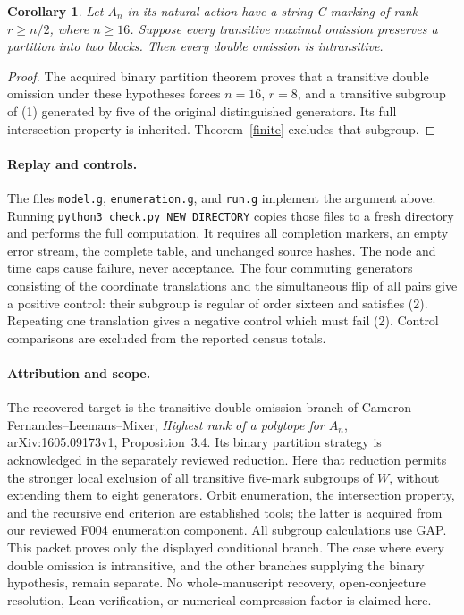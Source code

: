 \documentclass[11pt,a4paper]{article}
\newtheorem{corollary}[theorem]{Corollary}
\begin{document}
\begin{corollary}
Let $A_n$ in its natural action have a string C-marking of rank
$r\ge n/2$, where $n\ge16$. Suppose every transitive maximal
omission preserves a partition into two blocks. Then every
double omission is intransitive.
\end{corollary}
\begin{proof}
The acquired binary partition theorem proves that a transitive
double omission under these hypotheses forces $n=16$, $r=8$,
and a transitive subgroup of (1) generated by five of the original
distinguished generators. Its full intersection property is
inherited. Theorem~\ref{finite} excludes that subgroup.
\end{proof}

\paragraph{Replay and controls.}
The files \texttt{model.g}, \texttt{enumeration.g}, and
\texttt{run.g} implement the argument above. Running
\texttt{python3 check.py NEW\_DIRECTORY} copies those files to a
fresh directory and performs the full computation. It requires
all completion markers, an empty error stream, the complete table,
and unchanged source hashes. The node and time caps cause failure,
never acceptance. The four commuting generators consisting of
the coordinate translations and the simultaneous flip of all
pairs give a positive control: their subgroup is regular of order
sixteen and satisfies (2). Repeating one translation gives a
negative control which must fail (2). Control comparisons are
excluded from the reported census totals.

\paragraph{Attribution and scope.}
The recovered target is the transitive double-omission branch
of Cameron--Fernandes--Leemans--Mixer, \emph{Highest rank of a
polytope for $A_n$}, arXiv:1605.09173v1, Proposition~3.4.
Its binary partition strategy is acknowledged in the separately
reviewed reduction. Here that reduction permits the stronger
local exclusion of all transitive five-mark subgroups of $W$,
without extending them to eight generators. Orbit enumeration,
the intersection property, and the recursive end criterion are
established tools; the latter is acquired from our reviewed F004
enumeration component. All subgroup calculations use GAP.
This packet proves only the displayed conditional branch. The
case where every double omission is intransitive, and the other
branches supplying the binary hypothesis, remain separate.
No whole-manuscript recovery, open-conjecture resolution, Lean
verification, or numerical compression factor is claimed here.
\end{document}
